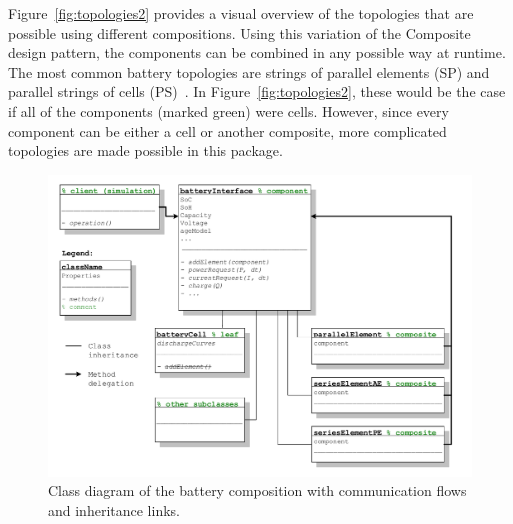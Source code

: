 Figure~\ref{fig:topologies2} provides a visual overview of the topologies that are possible using different compositions. Using this variation of the Composite design pattern, the components can be combined in any possible way at runtime. The most common battery topologies are strings of parallel elements (SP) and parallel strings of cells (PS)~\cite{cordoba-arenas_control-oriented_2015}. In Figure~\ref{fig:topologies2}, these would be the case if all of the components (marked green) were cells. However, since every component can be either a cell or another composite, more complicated topologies are made possible in this package. \\
\begin{figure}[t!]
	\captionsetup{type=figure}
	\centering
	\includegraphics[width=\textwidth]{composite_schema.pdf}
	\caption[Class diagram of the battery composition with communication flows and inheritance links]{Class diagram of the battery composition with communication flows and inheritance links.}
	\label{fig:composite_schema}
\end{figure}

